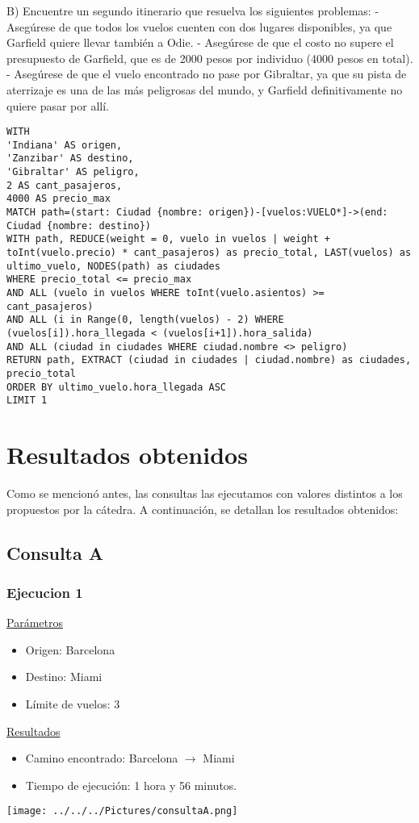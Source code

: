 \documentclass[a4paper,11pt]{article}
\begin{document}
B) Encuentre un segundo itinerario que resuelva los siguientes problemas:
- Asegúrese de que todos los vuelos cuenten con dos lugares disponibles, ya que Garfield quiere llevar también a Odie.
- Asegúrese de que el costo no supere el presupuesto de Garfield, que es de 2000 pesos por individuo (4000 pesos en total).
- Asegúrese de que el vuelo encontrado no pase por Gibraltar, ya que su pista de aterrizaje es una de las más peligrosas del mundo, y Garfield definitivamente no quiere pasar por allí.
\begin{verbatim}
WITH
'Indiana' AS origen,
'Zanzibar' AS destino,
'Gibraltar' AS peligro,
2 AS cant_pasajeros,
4000 AS precio_max
MATCH path=(start: Ciudad {nombre: origen})-[vuelos:VUELO*]->(end:
Ciudad {nombre: destino})
WITH path, REDUCE(weight = 0, vuelo in vuelos | weight +
toInt(vuelo.precio) * cant_pasajeros) as precio_total, LAST(vuelos) as
ultimo_vuelo, NODES(path) as ciudades
WHERE precio_total <= precio_max
AND ALL (vuelo in vuelos WHERE toInt(vuelo.asientos) >=
cant_pasajeros)
AND ALL (i in Range(0, length(vuelos) - 2) WHERE
(vuelos[i]).hora_llegada < (vuelos[i+1]).hora_salida)
AND ALL (ciudad in ciudades WHERE ciudad.nombre <> peligro)
RETURN path, EXTRACT (ciudad in ciudades | ciudad.nombre) as ciudades,
precio_total
ORDER BY ultimo_vuelo.hora_llegada ASC
LIMIT 1
\end{verbatim}

\newpage
\section*{Resultados obtenidos}
Como se mencionó antes, las consultas las ejecutamos con valores distintos a los propuestos por la cátedra.
A continuación, se detallan los resultados obtenidos:
\subsection*{Consulta A}
\subsubsection*{Ejecucion 1}
\underline{Parámetros}
\begin{itemize}
\item Origen: Barcelona
\item Destino: Miami
\item Límite de vuelos: 3
\end{itemize}
\underline{Resultados}
\begin{itemize}
\item Camino encontrado: Barcelona $\rightarrow$ Miami
\item Tiempo de ejecución: 1 hora y 56 minutos.
\end{itemize}
\texttt{[image: ../../../Pictures/consultaA.png]}
\end{document}
